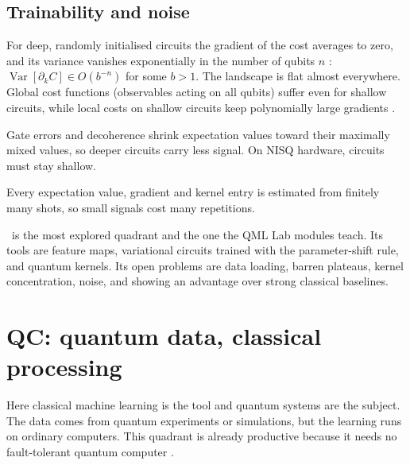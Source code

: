 \documentclass[11pt,a4paper]{article}
\begin{document}
\subsection{Trainability and noise}
\begin{description}[style=nextline,leftmargin=1.2em]
  \item[Barren plateaus] For deep, randomly initialised circuits the gradient of the cost averages to
        zero, and its variance vanishes exponentially in the number of qubits
        $n$ \citep{mcclean2018}: $\operatorname{Var}[\partial_kC]\in O(b^{-n})$ for some $b>1$. The
        landscape is flat almost everywhere. Global cost functions (observables acting on all qubits)
        suffer even for shallow circuits, while local costs on shallow circuits keep polynomially
        large gradients \citep{cerezo2021cost}.
  \item[Noise] Gate errors and decoherence shrink expectation values toward their maximally mixed
        values, so deeper circuits carry less signal. On NISQ hardware, circuits must stay shallow.
  \item[Shot noise] Every expectation value, gradient and kernel entry is estimated from finitely many
        shots, so small signals cost many repetitions.
\end{description}

\begin{inshort}
\CQ\ is the most explored quadrant and the one the QML Lab modules teach. Its tools are feature maps,
variational circuits trained with the parameter-shift rule, and quantum kernels. Its open problems
are data loading, barren plateaus, kernel concentration, noise, and showing an advantage over strong
classical baselines.
\end{inshort}

\section{QC: quantum data, classical processing}
\label{sec:qc}

Here classical machine learning is the tool and quantum systems are the subject. The data comes from
quantum experiments or simulations, but the learning runs on ordinary computers. This quadrant is
already productive because it needs no fault-tolerant quantum computer \citep{gebhart2023}.
\end{document}
